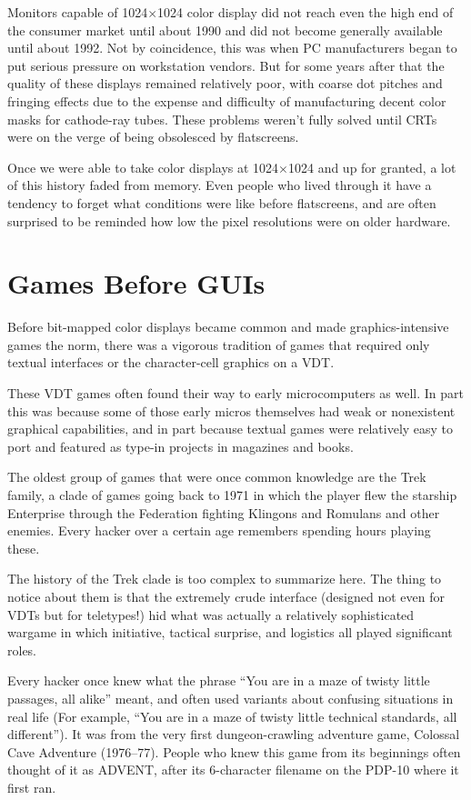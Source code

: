 \documentclass[12pt,letterpaper]{article}
\newcommand{\mc}{\small}
\newcommand{\acro}[1]{{\mc #1\spacefactor1000}}
\begin{document}
Monitors capable of 1024$\times$1024 color display did not reach even the high end of
the consumer market until about 1990 and did not become generally available
until about 1992. Not by coincidence, this was when \acro{PC} manufacturers began to
put serious pressure on workstation vendors. But for some years after that the
quality of these displays remained relatively poor, with coarse dot pitches and
fringing effects due to the expense and difficulty of manufacturing decent
color masks for cathode-ray tubes. These problems weren't fully solved until
\acro{CRT}s were on the verge of being obsolesced by flatscreens.

Once we were able to take color displays at 1024$\times$1024 and up for granted, a lot
of this history faded from memory. Even people who lived through it have a
tendency to forget what conditions were like before flatscreens, and are often
surprised to be reminded how low the pixel resolutions were on older hardware.

\section{Games Before GUIs}
Before bit-mapped color displays became common and made graphics-intensive
games the norm, there was a vigorous tradition of games that required only
textual interfaces or the character-cell graphics on a \acro{VDT}.

These \acro{VDT} games often found their way to early microcomputers as well. In part
this was because some of those early micros themselves had weak or nonexistent
graphical capabilities, and in part because textual games were relatively easy
to port and featured as type-in projects in magazines and books.

The oldest group of games that were once common knowledge are the Trek family,
a clade of games going back to 1971 in which the player flew the starship
Enterprise through the Federation fighting Klingons and Romulans and other
enemies. Every hacker over a certain age remembers spending hours playing
these.

The history of the Trek clade is too complex to summarize here. The thing to
notice about them is that the extremely crude interface (designed not even for
\acro{VDT}s but for teletypes!) hid what was actually a relatively sophisticated
wargame in which initiative, tactical surprise, and logistics all played
significant roles.

Every hacker once knew what the phrase ``You are in a maze of twisty little
passages, all alike'' meant, and often used variants about confusing situations
in real life (For example, ``You are in a maze of twisty little technical
standards, all different''). It was from the very first dungeon-crawling
adventure game, Colossal Cave Adventure (1976--77). People who knew this game
from its beginnings often thought of it as \acro{ADVENT}, after its 6-character
filename on the \acro{PDP-10} where it first ran.
\end{document}
